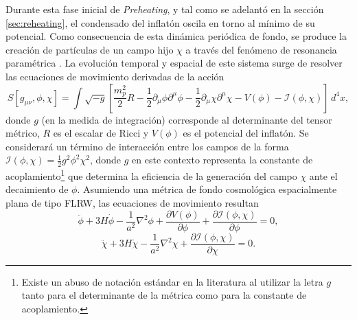 Durante esta fase inicial de \textit{Preheating}, y tal como se adelantó en la sección \ref{sec:reheating}, el condensado del inflatón oscila en torno al mínimo de su potencial. Como consecuencia de esta dinámica periódica de fondo, se produce la creación de partículas de un campo hijo $\chi$ a través del fenómeno de resonancia paramétrica \cite{Amin_2014, Kofman_1994, Kofman_1997}. La evolución temporal y espacial de este sistema surge de resolver las ecuaciones de movimiento derivadas de la acción
\begin{equation}
    S[g_{\mu \nu}, \phi, \chi] = \int \sqrt{-g} \left[ \frac{m_p^2}{2} R - \frac{1}{2} \partial_\mu \phi \partial^\mu \phi - \frac{1}{2} \partial_\mu \chi \partial^\mu \chi - V(\phi) - \mathcal{I} (\phi, \chi) \right] \, d^4 x,
\end{equation}
donde $g$ (en la medida de integración) corresponde al determinante del tensor métrico, $R$ es el escalar de Ricci y $V(\phi)$ es el potencial del inflatón. Se considerará un término de interacción entre los campos de la forma $\mathcal{I}(\phi, \chi) = \frac{1}{2} g^2 \phi^2 \chi^2$, donde $g$ en este contexto representa la constante de acoplamiento\footnote{Existe un abuso de notación estándar en la literatura al utilizar la letra $g$ tanto para el determinante de la métrica como para la constante de acoplamiento.} que determina la eficiencia de la generación del campo $\chi$ ante el decaimiento de $\phi$. Asumiendo una métrica de fondo cosmológica espacialmente plana de tipo FLRW, las ecuaciones de movimiento resultan
\begin{equation}\label{eqn:preheating_phi}
    \ddot{\phi} + 3 H \dot{\phi} - \frac{1}{a^2} \nabla^2 \phi + \frac{\partial V(\phi)}{\partial \phi} + \frac{\partial \mathcal{I} (\phi, \chi)}{\partial \phi} = 0,
\end{equation}
\begin{equation}
    \ddot{\chi} + 3 H \dot{\chi} - \frac{1}{a^2} \nabla^2 \chi + \frac{\partial \mathcal{I} (\phi, \chi)}{\partial \chi} = 0.
\end{equation}

